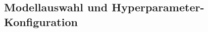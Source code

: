 \documentclass[11pt,a4paper]{article}
\begin{document}
    \subsection{Modellauswahl und Hyperparameter-Konfiguration}
\end{document}
